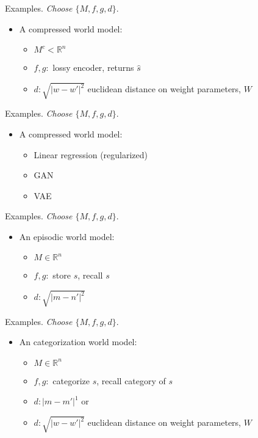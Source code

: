 \documentclass[10pt]{beamer}
\begin{document}
\begin{frame}[fragile]{Examples.}
\textit{Choose $\{M, f, g, d\}$}.
\begin{itemize}
    \item A compressed world model:
    \begin{itemize}
        \item $M^c < \mathbb{R}^n$
        \item $f,g: $ lossy encoder, returns $\hat s$
        \item $d: \sqrt{|w - w'|^2}$ euclidean distance on weight parameters, $W$
    \end{itemize}
\end{itemize}
\end{frame}

\begin{frame}[fragile]{Examples.}
\textit{Choose $\{M, f, g, d\}$}.
\begin{itemize}
    \item A compressed world model:
    \begin{itemize}
        \item Linear regression (regularized)
        \item GAN
        \item VAE
    \end{itemize}
\end{itemize}
\end{frame}

\begin{frame}[fragile]{Examples.}
\textit{Choose $\{M, f, g, d\}$}.
\begin{itemize}
    \item An episodic world model:
    \begin{itemize}
        \item $M \in \mathbb{R}^n$
        \item $f,g: $ store $s$, recall $s$
        \item $d: \sqrt{|m - n'|^2}$ 
    \end{itemize}
\end{itemize}
\end{frame}

\begin{frame}[fragile]{Examples.}
\textit{Choose $\{M, f, g, d\}$}.
\begin{itemize}
    \item An categorization world model:
    \begin{itemize}
        \item $M \in \mathbb{R}^n$
        \item $f,g: $ categorize $s$, recall category of $s$
        \item $d: |m - m'|^1$ or 
        \item $d: \sqrt{|w - w'|^2}$ euclidean distance on weight parameters, $W$
    \end{itemize}
\end{itemize}
\end{frame}
\end{document}
